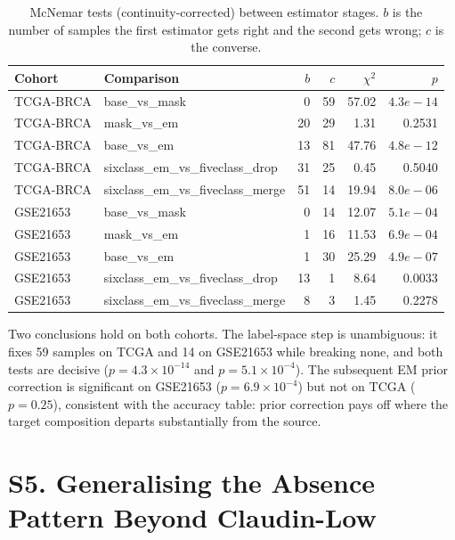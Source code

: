 \documentclass[11pt,a4paper]{article}
\begin{document}
\begin{table}[H]
\centering
\caption{McNemar tests (continuity-corrected) between estimator stages. $b$ is the number
of samples the first estimator gets right and the second gets wrong; $c$ is the converse.}
\label{supp:tab:mcnemar}
\begin{tabular}{llrrrr}
\toprule
\textbf{Cohort} & \textbf{Comparison} & \textbf{$b$} & \textbf{$c$} & \textbf{$\chi^2$} & \textbf{$p$} \\
\midrule
    TCGA-BRCA & base\_vs\_mask & 0 & 59 & 57.02 & $4.3e-14$ \\
    TCGA-BRCA & mask\_vs\_em & 20 & 29 & 1.31 & 0.2531 \\
    TCGA-BRCA & base\_vs\_em & 13 & 81 & 47.76 & $4.8e-12$ \\
    TCGA-BRCA & sixclass\_em\_vs\_fiveclass\_drop & 31 & 25 & 0.45 & 0.5040 \\
    TCGA-BRCA & sixclass\_em\_vs\_fiveclass\_merge & 51 & 14 & 19.94 & $8.0e-06$ \\
    \midrule
    GSE21653 & base\_vs\_mask & 0 & 14 & 12.07 & $5.1e-04$ \\
    GSE21653 & mask\_vs\_em & 1 & 16 & 11.53 & $6.9e-04$ \\
    GSE21653 & base\_vs\_em & 1 & 30 & 25.29 & $4.9e-07$ \\
    GSE21653 & sixclass\_em\_vs\_fiveclass\_drop & 13 & 1 & 8.64 & 0.0033 \\
    GSE21653 & sixclass\_em\_vs\_fiveclass\_merge & 8 & 3 & 1.45 & 0.2278 \\
    \bottomrule
\end{tabular}
\end{table}

Two conclusions hold on both cohorts. The label-space step is unambiguous: it fixes 59
samples on TCGA and 14 on GSE21653 while breaking none, and both tests are decisive
($p{=}4.3\times10^{-14}$ and $p{=}5.1\times10^{-4}$). The subsequent EM prior correction is
significant on GSE21653 ($p{=}6.9\times10^{-4}$) but not on TCGA ($p{=}0.25$), consistent
with the accuracy table: prior correction pays off where the target composition departs
substantially from the source.


\section*{S5. Generalising the Absence Pattern Beyond Claudin-Low}
\label{supp:absence}
\end{document}
